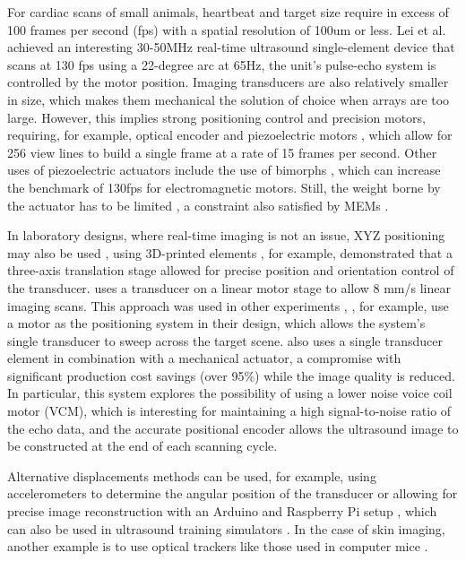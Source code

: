 \documentclass{article}
\begin{document}
For cardiac scans of small animals, heartbeat and target size require in excess of 100 frames per second (fps) with a spatial resolution of 100um or less. Lei et al. \cite{lei_high-frame_nodate} achieved an interesting 30-50MHz real-time ultrasound single-element device that scans at 130 fps using a 22-degree arc at 65Hz, the unit's pulse-echo system is controlled by the motor position. Imaging transducers are also relatively smaller in size, which makes them mechanical the solution of choice when arrays are too large. However, this implies strong positioning control and precision motors, requiring, for example, optical encoder and  piezoelectric motors \cite{carotenuto_very_2004}, which allow for 256 view lines to build a single frame at a rate of 15 frames per second. Other uses of piezoelectric actuators include the use of bimorphs \cite{bezanson_low-cost_2011}, which can increase the benchmark of 130fps for electromagnetic motors. Still, the weight borne by the actuator has to be limited \cite{brown_low_2013, huang_novel_2015}, a constraint also satisfied by MEMs \cite{choi_versatile_2020}.

In laboratory designs, where real-time imaging is not an issue, XYZ positioning may also be used \cite{svilainis_electronics_2014, wang_high_2019, xu_enabling_2019}, using 3D-printed elements \cite{bottenus_feasibility_2016}, for example, demonstrated that a three-axis translation stage allowed for precise position and orientation control of the transducer. \cite{qiu_programmable_2011} uses a transducer on a linear motor stage to allow 8 mm/s linear imaging scans. This approach was used in other experiments \cite{govindan_reconfigurable_2015, soto-cajiga_fpga-based_2012},  \cite{heuvel_development_2017}, for example, use a motor as the positioning system in their design, which allows the system's single transducer to sweep across the target scene.  \cite{smith_design_2015} also uses a single transducer element in combination with a mechanical actuator, a compromise with significant production cost savings (over 95\%) while the image quality is reduced.  In particular, this system explores the possibility  of using a lower noise voice coil motor (VCM), which is interesting for maintaining a high signal-to-noise ratio of the echo data, and the accurate positional encoder allows the ultrasound image to be constructed at the end of each scanning cycle.

Alternative displacements methods can be used, for example, using accelerometers to determine the angular position of the transducer  \cite{sobhani_portable_2016} or allowing for precise image reconstruction with an Arduino and Raspberry Pi setup \cite{herickhoff_low-cost_2019}, which can also be used in ultrasound training simulators \cite{farsoni_low-cost_2017}. In the case of skin imaging, another example is to use optical trackers like those used in computer mice \cite{zhang_free-hand_2019, poulsen_optical_2005, herickhoff_low-cost_2018}.
\end{document}
